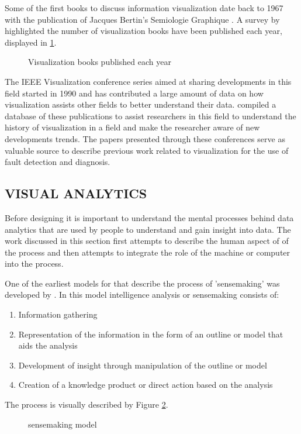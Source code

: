 Some of the first books to discuss information visualization date back to 1967 with the publication of Jacques Bertin's Semiologie Graphique \cite{rees2019survey}. A survey by \cite{rees2019survey} highlighted the number of visualization books have been published each year, displayed in \ref{fig:1}.

\begin{figure}[!ht]
	
	\centering{}
	\caption{Visualization books published each year}\label{fig:1}
	
\end{figure}

The IEEE Visualization conference series aimed at sharing developments in this field started in 1990 and has contributed a large amount of data on how visualization assists other fields to better understand their data. \cite{isenberg2016vispubdata} compiled a database of these publications to assist researchers in this field to understand the history of visualization in a field and make the researcher aware of new developments trends. The papers presented through these conferences serve as valuable source to describe previous work related to visualization for the use of fault detection and diagnosis.

\subsection{VISUAL ANALYTICS}

Before designing it is important to understand the mental processes behind data analytics that are used by people to understand and gain insight into data. The work discussed in this section first attempts to describe the human aspect of of the process and then attempts to integrate the role of the machine or computer into the process.

One of the earliest  models for that describe the process of 'sensemaking' was developed by \cite{pirolli2005sensemaking}. In this model intelligence analysis or sensemaking  consists of:
\begin{enumerate}
	\item Information gathering
	\item Representation of the information in the form of an outline or model that aids the analysis
	\item Development of insight through manipulation of the outline or model
	\item Creation of a knowledge product or direct action based on the analysis
\end{enumerate}
The process is visually described by Figure \ref{fig:3}.
\begin{figure}[!ht]
	\centering{}
	\caption{\cite{pirolli2005sensemaking} sensemaking model}\label{fig:3}
\end{figure}

